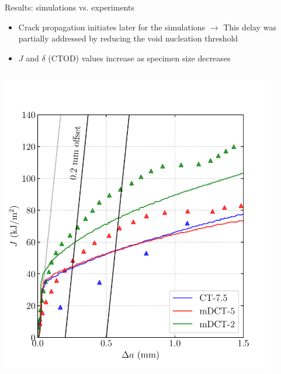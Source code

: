 \documentclass[9pt]{beamer}
\begin{document}
\begin{frame}{Results: simulations vs. experiments}

\begin{itemize}
    \item Crack propagation initiates later for the simulations $\rightarrow$ This delay was partially addressed by reducing the void nucleation threshold
    \vspace{0.15cm}
    \item $J$ and $\delta$ (CTOD) values increase as specimen size decreases
\end{itemize}

\begin{columns}
    \centering
    \includegraphics[width=0.9\textwidth]{Images/plot_J-da_ALL_X52.pdf}
    

\end{columns}
\end{frame}
\end{document}
